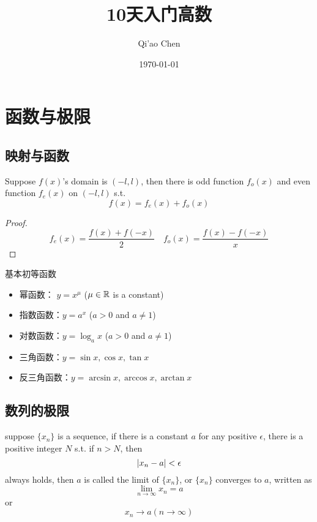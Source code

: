 \documentclass[11pt]{article}
\author{Qi'ao Chen}
\date{\today}
\title{10天入门高数}
\begin{document}
\maketitle
\tableofcontents \clearpage
\section{函数与极限}
\label{sec:org1bcca36}
\subsection{映射与函数}
\label{sec:orgc4c8b4f}
\begin{proposition}[]
Suppose \(f(x)\)'s domain is \((-l,l)\), then there is odd function
\(f_o(x)\) and even function \(f_e(x)\) on \((-l,l)\) s.t.
\begin{equation*}
f(x)=f_e(x)+f_o(x)
\end{equation*}
\end{proposition}

\begin{proof}
\begin{equation*}
f_e(x)=\frac{f(x)+f(-x)}{2}\quad
f_o(x)=\frac{f(x)-f(-x)}{x}
\end{equation*}
\end{proof}

基本初等函数
\begin{itemize}
\item 幂函数： \(y=x^\mu\) (\(\mu\in\mathbb{R}\) is a constant)
\item 指数函数：\(y=a^x\) (\(a\iffalse<\fi>0\) and \(a\neq1\))
\item 对数函数：\(y=\log_ax\) (\(a>0\) and \(a\neq1\))
\item 三角函数：\(y=\sin x,\cos x,\tan x\)
\item 反三角函数：\(y=\arcsin x,\arccos x,\arctan x\)
\end{itemize}
\subsection{数列的极限}
\label{sec:org2815f12}
\begin{definition}[]
suppose \(\{x_n\}\) is a sequence, if there is a constant \(a\) for any
positive \(\epsilon\), there is a positive integer \(N\) s.t. if \(n>N\), then
\begin{equation*}
\abs{x_n-a}<\epsilon
\end{equation*}
always holds, then \(a\) is called the limit of \(\{x_n\}\), or \(\{x_n\}\)
converges to \(a\), written as
\begin{equation*}
\lim_{n\to\infty}x_n=a
\end{equation*}
or
\begin{equation*}
x_n\to a(n\to \infty)
\end{equation*}
\end{definition}
\end{document}
